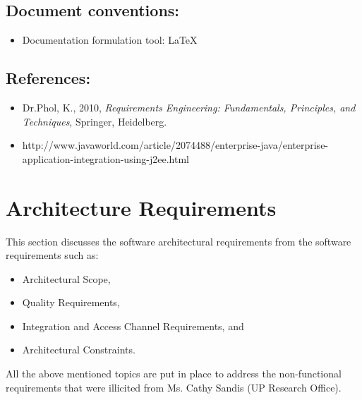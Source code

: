 \documentclass[12pt]{article}
\newcommand{\client}{Ms. Cathy Sandis (UP Research Office)}
\begin{document}
\vspace{0.5in}

\subsection{Document conventions:}
\vspace{0.1in}
\begin{itemize}
\item Documentation formulation tool: LaTeX
\end{itemize}

\vspace{0.2in}

\subsection{References:}
\vspace{0.1in}
\begin{itemize}
\item Dr.Phol, K., 2010, \textit{Requirements Engineering: Fundamentals, Principles, and Techniques}, Springer, Heidelberg.
\item http://www.javaworld.com/article/2074488/enterprise-java/enterprise-application-integration-using-j2ee.html
\end{itemize}	

\vspace{0.5in}

\newpage

\section{Architecture Requirements} 
This section discusses the software architectural requirements from the software requirements such as:
\begin{itemize}
\item Architectural Scope,
\item Quality Requirements,
\item Integration and Access Channel Requirements, and
\item Architectural Constraints.
\end{itemize}
All the above mentioned topics are put in place to address the non-functional requirements that were illicited from \client .

\end{document}
